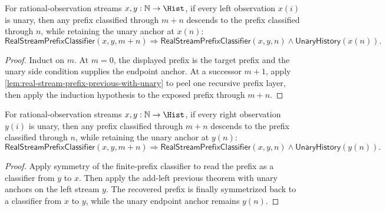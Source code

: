 \begin{theorem}
\label{thm:real-stream-prefix-add-left-previous-with-unary}
For rational-observation streams \(x,y:\mathbb{N}\to\Hist\), if every left observation \(x(i)\) is unary, then any prefix classified through \(m+n\) descends to the prefix classified through \(n\), while retaining the unary anchor at \(x(n)\):
$$
\mathsf{RealStreamPrefixClassifier}(x,y,m+n)
\Longrightarrow
\mathsf{RealStreamPrefixClassifier}(x,y,n)\wedge \mathsf{UnaryHistory}(x(n)).
$$
\end{theorem}
\begin{proof}
Induct on \(m\). At \(m=0\), the displayed prefix is the target prefix and the unary side condition supplies the endpoint anchor. At a successor \(m+1\), apply \autoref{lem:real-stream-prefix-previous-with-unary} to peel one recursive prefix layer, then apply the induction hypothesis to the exposed prefix through \(m+n\).
\end{proof}

\begin{lemma}
\label{lem:real-stream-prefix-add-left-previous-with-right-unary}
For rational-observation streams $x,y:\mathbb{N}\to\Hist$, if every right observation $y(i)$ is unary, then any prefix classified through $m+n$ descends to the prefix classified through $n$, while retaining the unary anchor at $y(n)$:
$$
\mathsf{RealStreamPrefixClassifier}(x,y,m+n)
\Longrightarrow
\mathsf{RealStreamPrefixClassifier}(x,y,n)\wedge \mathsf{UnaryHistory}(y(n)).
$$
\end{lemma}
\begin{proof}
Apply symmetry of the finite-prefix classifier to read the prefix as a classifier from $y$ to $x$. Then apply the add-left previous theorem with unary anchors on the left stream $y$. The recovered prefix is finally symmetrized back to a classifier from $x$ to $y$, while the unary endpoint anchor remains $y(n)$.
\end{proof}
